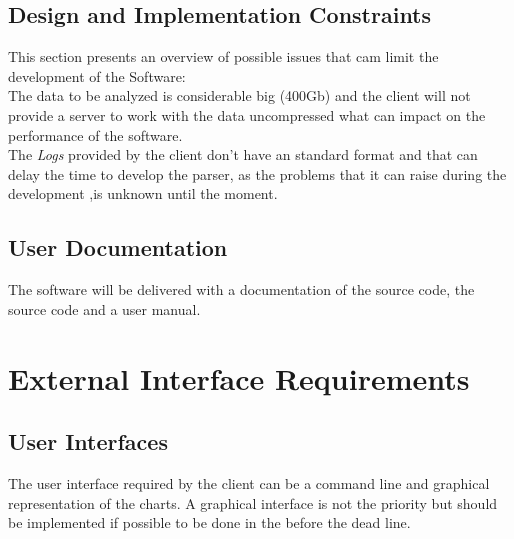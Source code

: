 \documentclass{scrreprt}
\begin{document}
\section{Design and Implementation Constraints}
This section presents an overview of possible issues that cam limit the
development of the Software:\\
The data to be analyzed is considerable big (400Gb) and the client will not provide a
server to work with the data uncompressed what can impact on the performance of
the software.\\
The \textit{Logs} provided by the client don't have an standard format and that
can delay the time to develop the parser, as the problems that it can raise
during the development ,is unknown until the moment.




\section{User Documentation}
The software will be delivered with a documentation of the source code, the
source code and a user manual.



\chapter{External Interface Requirements}

\section{User Interfaces}
The user interface required by the client can be a command line and
graphical representation of the charts.
A graphical interface is not the priority but should be implemented if possible
to be done in the before the dead line.
\end{document}

